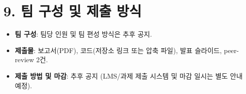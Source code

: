 \documentclass[12pt]{article}
\begin{document}
\section*{9. 팀 구성 및 제출 방식}
\begin{itemize}
\item \textbf{팀 구성}: 팀당 인원 및 팀 편성 방식은 추후 공지.
\item \textbf{제출물}: 보고서(PDF), 코드(저장소 링크 또는 압축
  파일), 발표 슬라이드, peer-review 2건.
\item \textbf{제출 방법 및 마감}: 추후 공지 (LMS/과제 제출 시스템
  및 마감 일시는 별도 안내 예정).
\end{itemize}
\end{document}
